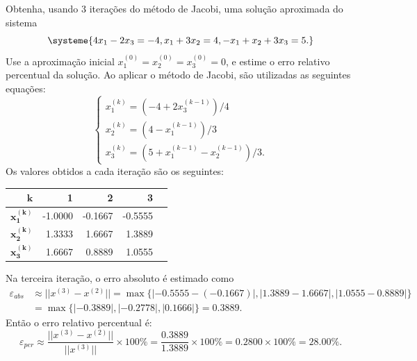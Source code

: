 \documentclass[12pt,a4paper]{article}
\begin{document}
\begin{ExerciseList}
\Exercise[title={2,5}]
Obtenha, usando 3 iterações do método de Jacobi, uma solução aproximada do sistema
\[
\systeme{
4x_1 - 2x_3        =-4,
 x_1 + 3x_2        = 4,
-x_1 +  x_2 + 3x_3 = 5.
}
\]
Use a aproximação inicial $x_1^{(0)} = x_2^{(0)} = x_3^{(0)} = 0$, e estime o erro relativo percentual da solução.
\Answer Ao aplicar o método de Jacobi, são utilizadas as seguintes equações:
\[
\begin{cases}
x_1^{(k)} = (-4 + 2x_3^{(k-1)})/4\\
x_2^{(k)} = (4 - x_1^{(k-1)})/3\\
x_3^{(k)} = (5 + x_1^{(k-1)} - x_2^{(k-1)})/3.
\end{cases}
\]
Os valores obtidos a cada iteração são os seguintes:
\begin{center}
\begin{tabular}{|r|r|r|r|r|}
\hline
$\mathbf{k}$     & 1 & 2 & 3 \\
\hline
$\mathbf{x_1^{(k)}}$ &-1.0000 &-0.1667 & -0.5555 \\
\hline
$\mathbf{x_2^{(k)}}$ & 1.3333 & 1.6667 &  1.3889 \\
\hline
$\mathbf{x_3^{(k)}}$ & 1.6667 & 0.8889 &  1.0555 \\
\hline
\end{tabular}
\end{center}
\medskip
Na terceira iteração, o erro absoluto é estimado como
\begin{align*}
\varepsilon_{abs}
& \approx || x^{(3)} - x^{(2)} ||
= \max\{|-0.5555 -(-0.1667)|,
        | 1.3889 -  1.6667|,
        | 1.0555 -  0.8889|\}\\
& = \max\{ |-0.3889|, |-0.2778|, |0.1666| \}
= 0.3889.
\end{align*}
Então o erro relativo percentual é:
\[
\varepsilon_{per}
\approx
\frac{ || x^{(3)} - x^{(2)} || }{ || x^{(3)} || } \times 100 \%
= \frac{ 0.3889 }{ 1.3889 } \times 100 \% 
= 0.2800 \times 100 \%
= 28.00 \%.
\]


\end{ExerciseList}
\end{document}

